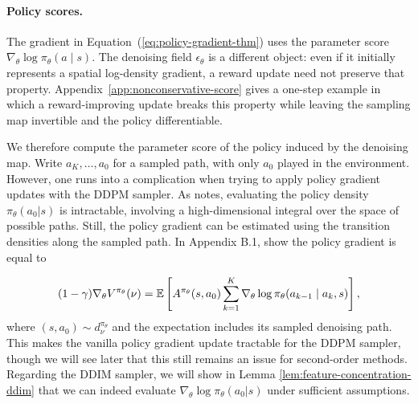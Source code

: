 





\paragraph{Policy scores.}
The gradient in Equation~(\ref{eq:policy-gradient-thm}) uses the parameter score $\nabla_\theta\log\pi_\theta(a\mid s)$. The denoising field $\epsilon_\theta$ is a different object: even if it initially represents a spatial log-density gradient, a reward update need not preserve that property. Appendix~\ref{app:nonconservative-score} gives a one-step example in which a reward-improving update breaks this property while leaving the sampling map invertible and the policy differentiable.



We therefore compute the parameter score of the policy induced by the denoising map. Write $a_K,\ldots,a_0$ for a sampled path, with only $a_0$ played in the environment. However, one runs into a complication when trying to apply policy gradient updates with the DDPM sampler. As \citet{psenka2024learningdiffusionmodelpolicy} notes, evaluating the policy density $\pi_\theta(a_{0}|s)$ is intractable, involving a high-dimensional integral over the space of possible paths. Still, the policy gradient can be estimated using the transition densities along the sampled path. In Appendix B.1, \citet{psenka2024learningdiffusionmodelpolicy} show the policy gradient is equal to

\begin{equation}
(1-\gamma)\nabla_\theta V^{\pi_\theta}(\nu)
=\mathbb{E}\left[A^{\pi_\theta}(s,a_0)\sum_{k=1}^{K}
\nabla_\theta\log\pi_\theta(a_{k-1}\mid a_k,s)\right],
\label{eq:diffusion-pg-thm}
\end{equation}
where $(s,a_0)\sim d_\nu^{\pi_\theta}$ and the expectation includes its sampled
denoising path.
This makes the vanilla policy gradient update tractable for the DDPM sampler, though we will see later that this still remains an issue for second-order methods. Regarding the DDIM sampler, we will show in Lemma \ref{lem:feature-concentration-ddim} that we can indeed evaluate $\nabla_\theta \log\pi_\theta(a_0 | s)$ under sufficient assumptions.

